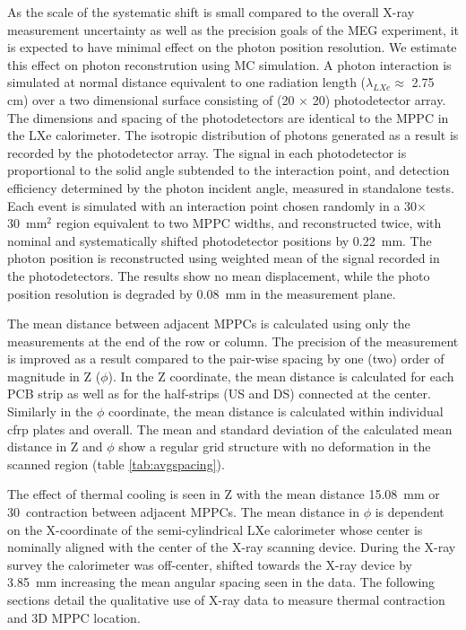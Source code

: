 As the scale of the systematic shift is small compared to the overall
X-ray measurement uncertainty as well as the precision goals of the
MEG experiment, it is expected to have minimal effect on the photon
position resolution.  We estimate this effect on photon reconstrution
using MC simulation.  A photon interaction is simulated at
normal distance equivalent to one radiation length
($\lambda_{LXe}\approx$ 2.75 cm) over a two dimensional surface
consisting of (20 $\times$ 20) photodetector array.  The dimensions and
spacing of the photodetectors are identical to the MPPC 
in the LXe calorimeter.  The isotropic distribution of photons generated as a
result is recorded by the photodetector array. The signal in each
photodetector is proportional to the solid angle subtended to the
interaction point, and detection efficiency determined by the photon
incident angle, measured in standalone tests.  
Each event is simulated with an interaction point
chosen randomly in a 30$\times$30~mm$^2$ region equivalent to two MPPC
widths, and reconstructed twice, with nominal and systematically
shifted photodetector positions by 0.22~mm.  The photon position is
reconstructed using weighted mean of the signal recorded in the
photodetectors.
The results show no mean displacement, while the photo 
position resolution is degraded by 0.08~mm in the 
measurement plane.

The mean distance between adjacent MPPCs is calculated using only the
measurements at the end of the row or column.  The precision of the
measurement is improved as a result compared to the pair-wise spacing
by  one (two) order of magnitude in Z ($\phi$).  In the Z coordinate,
the mean distance is calculated for each PCB strip as well as for the
half-strips (US and DS) connected at the center.  Similarly in the
$\phi$ coordinate, the mean distance is calculated within individual
cfrp plates and overall.  The mean and standard deviation of the
calculated mean distance in Z and $\phi$  show a regular grid
structure with no deformation in the scanned region (table
\ref{tab:avgspacing}).

The effect of thermal cooling is seen in Z with the mean distance
15.08~mm  or 30~\micron contraction between adjacent MPPCs. The mean
distance in $\phi$ is dependent on the X-coordinate of the
semi-cylindrical LXe calorimeter whose center is nominally aligned
with the center of the X-ray scanning device.  During the X-ray survey
the calorimeter was off-center, shifted towards the X-ray device by
3.85~mm increasing the mean angular spacing seen in the data.  The
following sections detail the qualitative use of X-ray data to measure
thermal contraction and 3D MPPC location.

